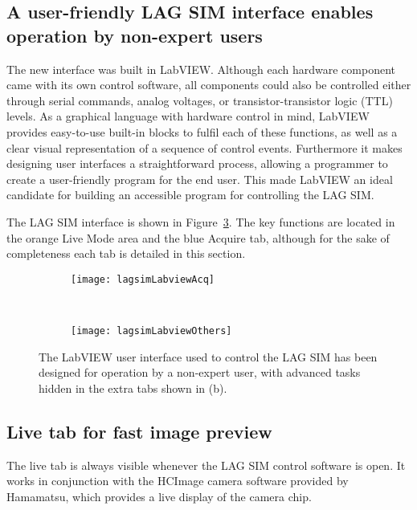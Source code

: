 \subsection{A user-friendly LAG SIM interface enables operation by non-expert users}
The new interface was built in LabVIEW.
Although each hardware component came with its own control software, all components could also be controlled either through serial commands, analog voltages, or transistor-transistor logic (TTL) levels.
As a graphical language with hardware control in mind, LabVIEW provides easy-to-use built-in blocks to fulfil each of these functions, as well as a clear visual representation of a sequence of control events.
Furthermore it makes designing user interfaces a straightforward process, allowing a programmer to create a user-friendly program for the end user.
This made LabVIEW an ideal candidate for building an accessible program for controlling the LAG SIM.

The LAG SIM interface is shown in Figure~\ref{fig:lagsimLabview}.
The key functions are located in the orange Live Mode area and the blue Acquire tab, although for the sake of completeness each tab is detailed in this section.

\begin{figure}[p]
\centering
\begin{subfigure}[b]{0.6\textwidth}
	\texttt{[image: lagsimLabviewAcq]}
	\caption{}\label{fig:fpbLabviewAcq}
\end{subfigure}

~\newline
\begin{subfigure}[b]{1.0\textwidth}
	\texttt{[image: lagsimLabviewOthers]}
	\caption{}\label{fig:fpbLabviewTabs}
\end{subfigure}
\caption[LAG SIM: The LabVIEW user interface for controlling LAG SIM is designed for operation by non-expert users]{The LabVIEW user interface used to control the LAG SIM has been designed for operation by a non-expert user, with advanced tasks hidden in the extra tabs shown in (b). } %
\label{fig:lagsimLabview}
\end{figure}

\subsection{Live tab for fast image preview} \label{sec:lagsimLive}
The live tab is always visible whenever the LAG SIM control software is open.
It works in conjunction with the HCImage camera software provided by Hamamatsu, which provides a live display of the camera chip.

